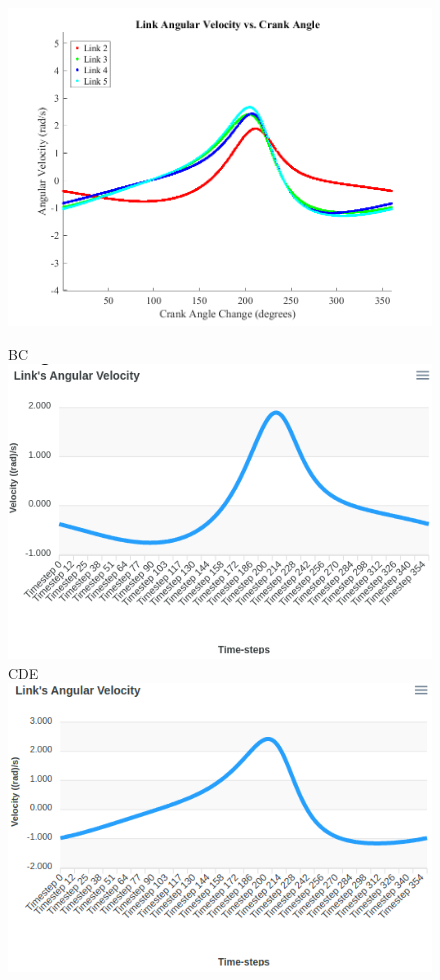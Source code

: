 \documentclass[12pt]{article}
\begin{document}
\begin{figure}[ht]
  \centering
  \includegraphics[scale=0.5]{../matlab-plots/angLinkVel.png}

  BC \includegraphics[scale=0.4]{../pmks-plots/angLinkVel/angLinkVelCB.png}%
  CDE \includegraphics[scale=0.4]{../pmks-plots/angLinkVel/angLinkVelCDE.png}


\end{figure}
\end{document}
